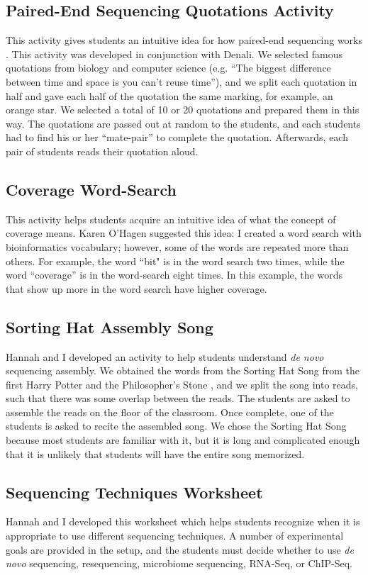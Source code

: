 \documentclass{report}
\begin{document}
\subsection{Paired-End Sequencing Quotations Activity}
This activity gives students an intuitive idea for how paired-end sequencing works \cite{roach1995pairwise, fleischmann1995whole}. This activity was developed in conjunction with Denali. We selected famous quotations from biology and computer science (e.g. ``The biggest difference between time and space is you can't reuse time''), and we split each quotation in half and gave each half of the quotation the same marking, for example, an orange star. We selected a total of 10 or 20 quotations and prepared them in this way. The quotations are passed out at random to the students, and each students had to find his or her ``mate-pair'' to complete the quotation. Afterwards, each pair of students reads their quotation aloud.

\subsection{Coverage Word-Search}
This activity helps students acquire an intuitive idea of what the concept of coverage means. Karen O'Hagen suggested this idea: I created a word search with bioinformatics vocabulary; however, some of the words are repeated more than others. For example, the word ``bit" is in the word search two times, while the word ``coverage'' is in the word-search eight times. In this example, the words that show up more in the word search have higher coverage.

\subsection{Sorting Hat Assembly Song}
Hannah and I developed an activity to help students understand \emph{de novo} sequencing assembly. We obtained the words from the Sorting Hat Song from the first Harry Potter and the Philosopher's Stone \cite{rowling1997harry}, and we split the song into reads, such that there was some overlap between the reads. The students are asked to assemble the reads on the floor of the classroom. Once complete,  one of the students is asked to recite the assembled song. We chose the Sorting Hat Song because most students are familiar with it, but it is long and complicated enough that it is unlikely that students will have the entire song memorized. 

\subsection{Sequencing Techniques Worksheet}
Hannah and I developed this worksheet which helps students recognize when it is appropriate to use different sequencing techniques. A number of experimental goals are provided in the setup, and the students must decide whether to use \emph{de novo} sequencing, resequencing, microbiome sequencing, RNA-Seq, or ChIP-Seq.
\end{document}
